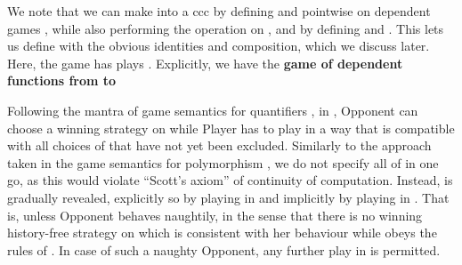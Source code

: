 \documentclass[runningheads,a4paper]{llncs}
\renewcommand{\emph}[1]{\textbf{#1}}
\begin{document}
We note that we can make  into a ccc by defining  and  pointwise on dependent games , while also performing the operation on , and by defining  and . This lets us define  with the obvious identities and composition, which we discuss later. Here, the game  has plays \linebreak. Explicitly, we have the \emph{game  of dependent functions from  to }\\
\resizebox{\linewidth}{!}{\parbox{\linewidth}{\vspace{-10pt}
}}
\vspace{-10pt}

Following the mantra of game semantics for quantifiers \cite{abramsky2005game}, in , Opponent can choose a winning strategy  on  while Player has to play in a way that is compatible with all choices of  that have not yet been excluded. Similarly to the approach taken in the game semantics for polymorphism \cite{abramsky2005game}, we do not specify all of  in one go, as this would violate ``Scott's axiom'' of continuity of computation. Instead,  is gradually revealed, explicitly so by playing in  and implicitly by playing in . That is, unless Opponent behaves naughtily, in the sense that there is no winning history-free strategy  on  which is consistent with her behaviour while  obeys the rules of . In case of such a naughty Opponent, any further play in  is permitted. 
\end{document}
